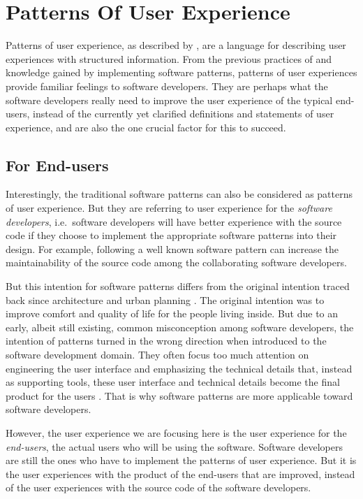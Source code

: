 \documentclass{acm_proc_article-sp}
\begin{document}
\section{Patterns Of User Experience}
\label{sec:pux}

Patterns of user experience, as described by \citet{pux:blackwell},
are a language for describing user experiences with structured
information. From the previous practices of and knowledge gained by
implementing software patterns, patterns of user experiences provide
familiar feelings to software developers. They are perhaps what the
software developers really need to improve the user experience of the
typical end-users, instead of the currently yet clarified definitions
and statements of user experience, and are also the one crucial factor
for this to succeed.

\subsection{For End-users}
Interestingly, the traditional software patterns can also be
considered as patterns of user experience. But they are referring to
user experience for the \textit{software developers}, i.e.\ software
developers will have better experience with the source code if they
choose to implement the appropriate software patterns into their
design. For example, following a well known software pattern can
increase the maintainability of the source code among the
collaborating software developers.

But this intention for software patterns differs from the original
intention traced back since architecture and urban planning
\citep{timeless:alexander}. The original intention was to improve
comfort and quality of life for the people living inside. But due to
an early, albeit still existing, common misconception among software
developers, the intention of patterns turned in the wrong direction
when introduced to the software development domain. They often focus
too much attention on engineering the user interface and emphasizing
the technical details that, instead as supporting tools, these user
interface and technical details become the final product for the users
\citep{pux:blackwell}. That is why software patterns are more
applicable toward software developers.

However, the user experience we are focusing here is the user
experience for the \textit{end-users}, the actual users who will be
using the software. Software developers are still the ones who have to
implement the patterns of user experience. But it is the user
experiences with the product of the end-users that are improved,
instead of the user experiences with the source code of the software
developers.
\end{document}
